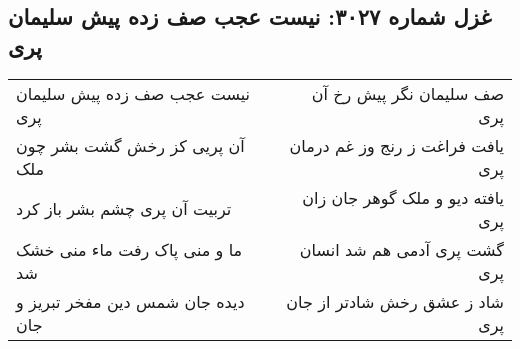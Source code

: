 \begin{center}
\section*{غزل شماره ۳۰۲۷: نیست عجب صف زده پیش سلیمان پری}
\label{sec:3027}
\begin{longtable}{l p{0.5cm} r}
نیست عجب صف زده پیش سلیمان پری
&&
صف سلیمان نگر پیش رخ آن پری
\\
آن پریی کز رخش گشت بشر چون ملک
&&
یافت فراغت ز رنج وز غم درمان پری
\\
تربیت آن پری چشم بشر باز کرد
&&
یافته دیو و ملک گوهر جان زان پری
\\
ما و منی پاک رفت ماء منی خشک شد
&&
گشت پری آدمی هم شد انسان پری
\\
دیده جان شمس دین مفخر تبریز و جان
&&
شاد ز عشق رخش شادتر از جان پری
\\
\end{longtable}
\end{center}
